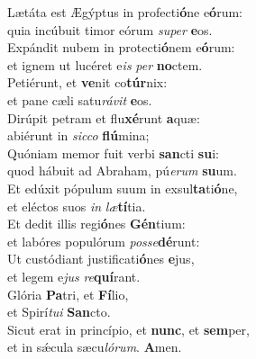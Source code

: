 \oddverse Lætáta est Ægýptus in profecti\textbf{ó}ne e\textbf{ó}rum:~\*\\
\oddverse quia incúbuit timor eórum \textit{su}\textit{per} \textbf{e}os.\\
\evenverse Expándit nubem in protecti\textbf{ó}nem e\textbf{ó}rum:~\*\\
\evenverse et ignem ut lucéret e\textit{is} \textit{per} \textbf{no}ctem.\\
\oddverse Petiérunt, et \textbf{ve}nit co\textbf{túr}nix:~\*\\
\oddverse et pane cæli satu\textit{rá}\textit{vit} \textbf{e}os.\\
\evenverse Dirúpit petram et flu\textbf{xé}runt \textbf{a}quæ:~\*\\
\evenverse abiérunt in \textit{sic}\textit{co} \textbf{flú}mina;\\
\oddverse Quóniam memor fuit verbi \textbf{san}cti \textbf{su}i:~\*\\
\oddverse quod hábuit ad Abraham, pú\textit{e}\textit{rum} \textbf{su}um.\\
\evenverse Et edúxit pópulum suum in exsul\textbf{ta}ti\textbf{ó}ne,~\*\\
\evenverse et eléctos suos \textit{in} \textit{læ}\textbf{tí}tia.\\
\oddverse Et dedit illis regi\textbf{ó}nes \textbf{Gén}tium:~\*\\
\oddverse et labóres populórum \textit{pos}\textit{se}\textbf{dé}runt:\\
\evenverse Ut custódiant justificati\textbf{ó}nes \textbf{e}jus,~\*\\
\evenverse et legem e\textit{jus} \textit{re}\textbf{quí}rant.\\
\oddverse Glória \textbf{Pa}tri, et \textbf{Fí}lio,~\*\\
\oddverse et Spirí\textit{tu}\textit{i} \textbf{San}cto.\\
\evenverse Sicut erat in princípio, et \textbf{nunc}, et \textbf{sem}per,~\*\\
\evenverse et in sǽcula sæcu\textit{ló}\textit{rum}. \textbf{A}men.\\
